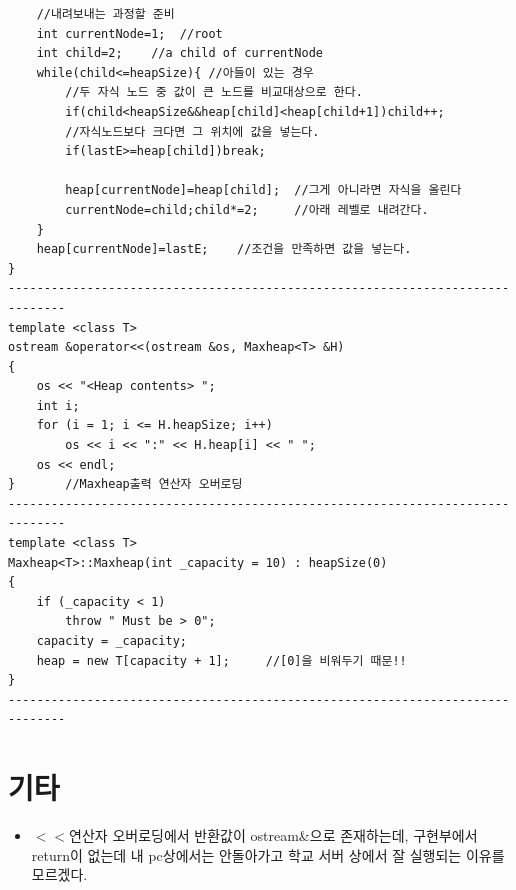 \documentclass[a4paper,11pt]{article}
\begin{document}
\begin{Verbatim}
    //내려보내는 과정할 준비
    int currentNode=1;  //root
    int child=2;    //a child of currentNode
    while(child<=heapSize){ //아들이 있는 경우     
        //두 자식 노드 중 값이 큰 노드를 비교대상으로 한다.
        if(child<heapSize&&heap[child]<heap[child+1])child++;
        //자식노드보다 크다면 그 위치에 값을 넣는다.
        if(lastE>=heap[child])break;

        heap[currentNode]=heap[child];  //그게 아니라면 자식을 올린다
        currentNode=child;child*=2;     //아래 레벨로 내려간다.
    }
    heap[currentNode]=lastE;	//조건을 만족하면 값을 넣는다.
}
------------------------------------------------------------------------------
template <class T>
ostream &operator<<(ostream &os, Maxheap<T> &H)
{
    os << "<Heap contents> ";
    int i;
    for (i = 1; i <= H.heapSize; i++)
        os << i << ":" << H.heap[i] << " ";
    os << endl;
}		//Maxheap출력 연산자 오버로딩
------------------------------------------------------------------------------
template <class T>
Maxheap<T>::Maxheap(int _capacity = 10) : heapSize(0)
{
    if (_capacity < 1)
        throw " Must be > 0";
    capacity = _capacity;
    heap = new T[capacity + 1];     //[0]을 비워두기 때문!!
}
------------------------------------------------------------------------------
\end{Verbatim}
\section{기타}
\begin{itemize}
\item $<<$연산자 오버로딩에서 반환값이 ostream\&으로 존재하는데, 구현부에서 return이 없는데 내 pc상에서는 안돌아가고 학교 서버 상에서 잘 실행되는 이유를 모르겠다.
\end{itemize}
\end{document}
